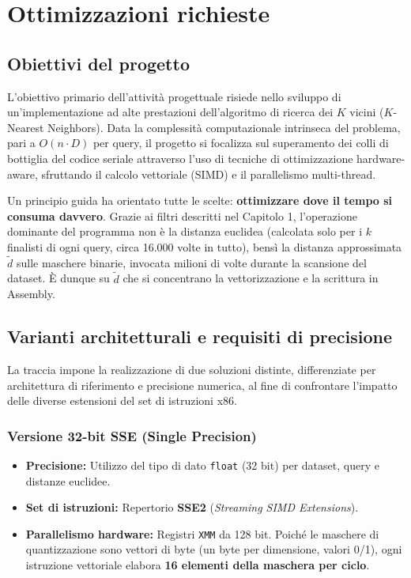 \maketitle
\chapter{Ottimizzazioni richieste}

\section{Obiettivi del progetto}
L'obiettivo primario dell'attività progettuale risiede nello sviluppo di un'implementazione ad alte prestazioni dell'algoritmo di ricerca dei $K$ vicini ($K$-Nearest Neighbors). Data la complessità computazionale intrinseca del problema, pari a $O(n \cdot D)$ per query, il progetto si focalizza sul superamento dei colli di bottiglia del codice seriale attraverso l'uso di tecniche di ottimizzazione hardware-aware, sfruttando il calcolo vettoriale (SIMD) e il parallelismo multi-thread.

Un principio guida ha orientato tutte le scelte: \textbf{ottimizzare dove il tempo si consuma davvero}. Grazie ai filtri descritti nel Capitolo 1, l'operazione dominante del programma non è la distanza euclidea (calcolata solo per i $k$ finalisti di ogni query, circa 16.000 volte in tutto), bensì la distanza approssimata $\tilde{d}$ sulle maschere binarie, invocata milioni di volte durante la scansione del dataset. È dunque su $\tilde{d}$ che si concentrano la vettorizzazione e la scrittura in Assembly.

\section{Varianti architetturali e requisiti di precisione}
La traccia impone la realizzazione di due soluzioni distinte, differenziate per architettura di riferimento e precisione numerica, al fine di confrontare l'impatto delle diverse estensioni del set di istruzioni x86.

\subsection{Versione 32-bit SSE (Single Precision)}
\begin{itemize}
    \item \textbf{Precisione:} Utilizzo del tipo di dato \texttt{float} (32 bit) per dataset, query e distanze euclidee.
    \item \textbf{Set di istruzioni:} Repertorio \textbf{SSE2} (\textit{Streaming SIMD Extensions}).
    \item \textbf{Parallelismo hardware:} Registri \texttt{XMM} da 128 bit. Poiché le maschere di quantizzazione sono vettori di byte (un byte per dimensione, valori 0/1), ogni istruzione vettoriale elabora \textbf{16 elementi della maschera per ciclo}.
\end{itemize}

